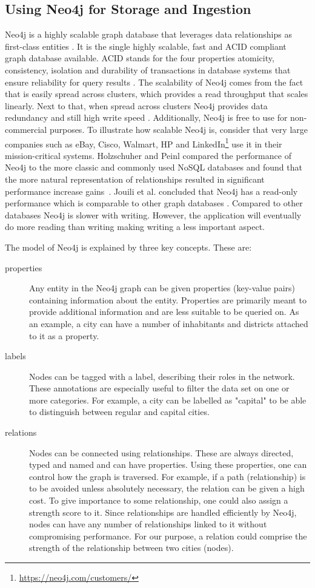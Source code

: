 \subsection{Using Neo4j for Storage and Ingestion}
Neo4j is a highly scalable graph database that leverages data relationships as first-class entities \cite{neo4j}. It is the single highly scalable, fast and ACID compliant graph database available. ACID stands for the four properties atomicity, consistency, isolation and durability of transactions in database systems that ensure reliability for query results \cite{haerder1983principles}. The scalability of Neo4j comes from the fact that is easily spread across clusters, which provides a read throughput that scales linearly. Next to that, when spread across clusters Neo4j provides data redundancy and still high write speed \cite{neo4jscalable}. Additionally, Neo4j is free to use for non-commercial purposes. To illustrate how scalable Neo4j is, consider that very large companies such as eBay, Cisco, Walmart, HP and LinkedIn\footnote{\url{https://neo4j.com/customers/}} use it in their mission-critical systems. Holzschuher and Peinl compared the performance of Neo4j to the more classic and commonly used NoSQL databases and found that the more natural representation of relationships resulted in significant performance increase gains~\cite{holzschuher2013performance}. Jouili et al. concluded that Neo4j has a read-only performance which is comparable to other graph databases \cite{jouili2013}. Compared to other databases Neo4j is slower with writing. However, the application will eventually do more reading than writing making writing a less important aspect.

The model of Neo4j is explained by three key concepts. These are:

\begin{description}
\item[properties] Any entity in the Neo4j graph can be given properties (key-value pairs) containing information about the entity. Properties are primarily meant to provide additional information and are less suitable to be queried on. As an example, a city can have a number of inhabitants and districts attached to it as a property.
\item[labels] Nodes can be tagged with a label, describing their roles in the network. These annotations are especially useful to filter the data set on one or more categories. For example, a city can be labelled as "capital" to be able to distinguish between regular and capital cities.
\item[relations] Nodes can be connected using relationships. These are always directed, typed and named and can have properties. Using these properties, one can control how the graph is traversed. For example, if a path (relationship) is to be avoided unless absolutely necessary, the relation can be given a high cost. To give importance to some relationship, one could also assign a strength score to it. Since relationships are handled efficiently by Neo4j, nodes can have any number of relationships linked to it without compromising performance. For our purpose, a relation could comprise the strength of the relationship between two cities (nodes).
\end{description}

